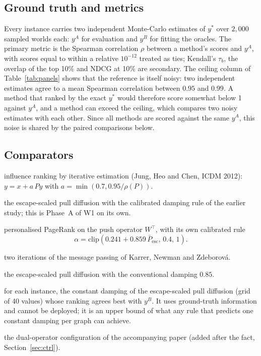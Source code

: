 \documentclass[11pt,a4paper]{article}
\newcommand{\Pescbar}{\bar{P}_{\mathrm{esc}}}
\begin{document}
\begin{table}[H]
\centering\small
\caption{Panels. ``Ceiling'' is the mean Spearman correlation between the two independent ground-truth samples, a measure of the noise of the reference.}\label{tab:panels}
\end{table}

\subsection{Ground truth and metrics}

Every instance carries two independent Monte-Carlo estimates of $y^*$ over $2{,}000$ sampled worlds each: $y^A$ for evaluation and $y^B$ for fitting the oracles. The primary metric is the Spearman correlation $\rho$ between a method's scores and $y^A$, with scores equal to within a relative $10^{-12}$ treated as ties; Kendall's $\tau_b$, the overlap of the top 10\% and NDCG at 10\% are secondary. The ceiling column of Table~\ref{tab:panels} shows that the reference is itself noisy: two independent estimates agree to a mean Spearman correlation between $0.95$ and $0.99$. A method that ranked by the exact $y^*$ would therefore score somewhat below 1 against $y^A$, and a method can exceed the ceiling, which compares two noisy estimates with each other. Since all methods are scored against the same $y^A$, this noise is shared by the paired comparisons below.

\subsection{Comparators}

\begin{description}[leftmargin=1.2em,itemsep=2pt]
\item[IRIE] influence ranking by iterative estimation (Jung, Heo and Chen, ICDM 2012): $y=x+a\,Py$ with $a=\min(0.7,0.95/\rho(P))$.
\item[EW rule] the escape-scaled pull diffusion with the calibrated damping rule of the earlier study; this is Phase~A of W1 on its own.
\item[WT rule] personalised PageRank on the push operator $W^{\top}$, with its own calibrated rule
\[\alpha=\mathrm{clip}(0.241+0.859\,\Pescbar,\,0.4,\,1).\]
\item[MP2] two iterations of the message passing of Karrer, Newman and Zdeborová.
\item[$\alpha{=}0.85$] the escape-scaled pull diffusion with the conventional damping $0.85$.
\item[oracle] for each instance, the constant damping of the escape-scaled pull diffusion (grid of 40 values) whose ranking agrees best with $y^B$. It uses ground-truth information and cannot be deployed; it is an upper bound of what any rule that predicts one constant damping per graph can achieve.
\item[CTRL] the dual-operator configuration of the accompanying paper (added after the fact, Section~\ref{sec:ctrl}).
\end{description}
\end{document}
